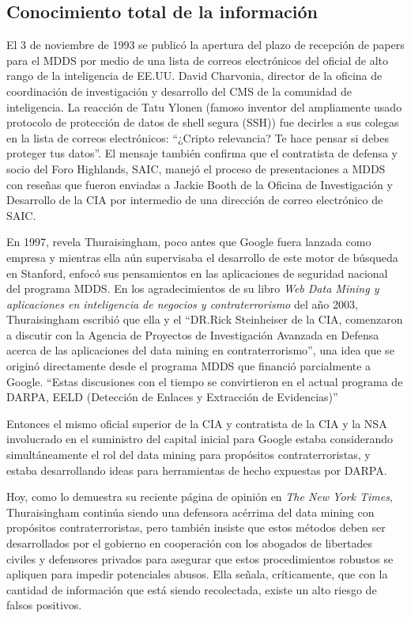 \documentclass[10pt,a5paper,twoside,spanish,]{book}
\begin{document}
\subsection{Conocimiento total de la
información}\label{conocimiento-total-de-la-informaciuxf3n}

El 3 de noviembre de 1993 se publicó la apertura del plazo de recepción
de papers para el MDDS por medio de una lista de correos electrónicos
del oficial de alto rango de la inteligencia de EE.UU. David Charvonia,
director de la oficina de coordinación de investigación y desarrollo del
CMS de la comunidad de inteligencia. La reacción de Tatu Ylonen (famoso
inventor del ampliamente usado protocolo de protección de datos de shell
segura (SSH)) fue decirles a sus colegas en la lista de correos
electrónicos: ``¿Cripto relevancia? Te hace pensar si debes proteger tus
datos''. El mensaje también confirma que el contratista de defensa y
socio del Foro Highlands, SAIC, manejó el proceso de presentaciones a
MDDS con reseñas que fueron enviadas a Jackie Booth de la Oficina de
Investigación y Desarrollo de la CIA por intermedio de una dirección de
correo electrónico de SAIC.

En 1997, revela Thuraisingham, poco antes que Google fuera lanzada como
empresa y mientras ella aún supervisaba el desarrollo de este motor de
búsqueda en Stanford, enfocó sus pensamientos en las aplicaciones de
seguridad nacional del programa MDDS. En los agradecimientos de su libro
\emph{Web Data Mining y aplicaciones en inteligencia de negocios y
contraterrorismo} del año 2003, Thuraisingham escribió que ella y el
``DR.Rick Steinheiser de la CIA, comenzaron a discutir con la Agencia de
Proyectos de Investigación Avanzada en Defensa acerca de las
aplicaciones del data mining en contraterrorismo'', una idea que se
originó directamente desde el programa MDDS que financió parcialmente a
Google. ``Estas discusiones con el tiempo se convirtieron en el actual
programa de DARPA, EELD (Detección de Enlaces y Extracción de
Evidencias)''

Entonces el mismo oficial superior de la CIA y contratista de la CIA y
la NSA involucrado en el suministro del capital inicial para Google
estaba considerando simultáneamente el rol del data mining para
propósitos contraterroristas, y estaba desarrollando ideas para
herramientas de hecho expuestas por DARPA.

Hoy, como lo demuestra su reciente página de opinión en \emph{The New
York Times}, Thuraisingham continúa siendo una defensora acérrima del
data mining con propósitos contraterroristas, pero también insiste que
estos métodos deben ser desarrollados por el gobierno en cooperación con
los abogados de libertades civiles y defensores privados para asegurar
que estos procedimientos robustos se apliquen para impedir potenciales
abusos. Ella señala, críticamente, que con la cantidad de información
que está siendo recolectada, existe un alto riesgo de falsos positivos.
\end{document}
